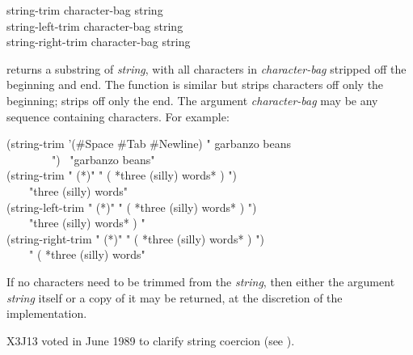 \begin{defun}[Function]
string-trim character-bag string \\
string-left-trim character-bag string \\
string-right-trim character-bag string

 returns a substring of \emph{string}, with all characters in
\emph{character-bag} stripped off the beginning and end.
The function  is similar but strips characters
off only the beginning;  strips off only the end.
The argument \emph{character-bag} may be any sequence containing
characters.
For example:
\begin{lisp}
(string-trim '(\#{\Xbackslash}Space \#{\Xbackslash}Tab \#{\Xbackslash}Newline) " garbanzo beans \\
~~~~~~~~") \EV\ "garbanzo beans" \\
(string-trim " (*)" " ( *three (silly) words* ) ") \\
~~~\EV\ "three (silly) words" \\
(string-left-trim " (*)" " ( *three (silly) words* ) ") \\
~~~\EV\ "three (silly) words* ) " \\
(string-right-trim " (*)" " ( *three (silly) words* ) ") \\
~~~\EV\ " ( *three (silly) words"
\end{lisp}
If no characters need to be trimmed from the \emph{string},
then either the argument \emph{string} itself or a copy of it may
be returned, at the discretion of the implementation.

\begin{newer}
X3J13 voted in June 1989 
to clarify string coercion (see ).
\end{newer}
\end{defun}

